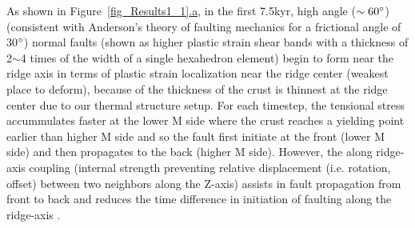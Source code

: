 As shown in Figure~\hyperref[fig_Results1_1]{\ref{fig_Results1_1}.a}, in the first 7.5kyr, high angle ($\sim 60 \degree$)(consistent with  Anderson's theory of faulting mechanics for a frictional angle of 30$\degree$) normal faults (shown as higher plastic strain shear bands with a thickness of 2$\sim$4 times of the width of a single hexahedron element) begin to form near the ridge axis in terms of plastic strain localization near the ridge center (weakest place to deform), because of the thickness of the crust is thinnest at the ridge center due to our thermal structure setup. For each timestep, the tensional stress accummulates faster at the lower M side where the crust reaches a yielding point earlier than higher M side and so the fault first initiate at the front (lower M side) and then propagates to the back (higher M side). However, the along ridge-axis coupling (internal strength preventing relative displacement (i.e. rotation, offset) between two neighbors along the Z-axis) assists in fault propagation from front to back and reduces the time difference in initiation of faulting along the ridge-axis .  

